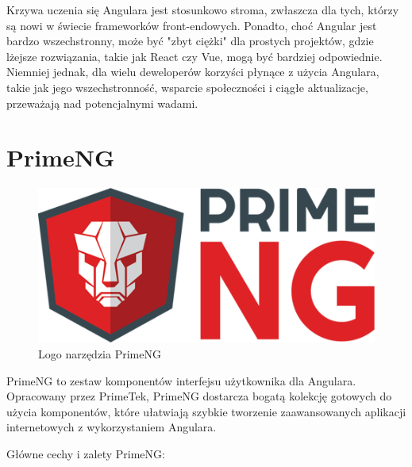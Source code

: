 Krzywa uczenia się Angulara jest stosunkowo stroma, zwłaszcza dla tych, którzy są nowi w świecie frameworków front-endowych. Ponadto, choć Angular jest bardzo wszechstronny, może być "zbyt ciężki" dla prostych projektów, gdzie lżejsze rozwiązania, takie jak React czy Vue, mogą być bardziej odpowiednie. Niemniej jednak, dla wielu deweloperów korzyści płynące z użycia Angulara, takie jak jego wszechstronność, wsparcie społeczności i ciągłe aktualizacje, przeważają nad potencjalnymi wadami.

\section{PrimeNG}
\begin{figure}[h]
    \centering
    \includegraphics[width=0.5\linewidth]{./img/primeng.png}
    \caption{Logo narzędzia PrimeNG}
    \label{fig:PrimeNG}
\end{figure}

PrimeNG to zestaw komponentów interfejsu użytkownika dla Angulara. Opracowany przez PrimeTek, PrimeNG dostarcza bogatą kolekcję gotowych do użycia komponentów, które ułatwiają szybkie tworzenie zaawansowanych aplikacji internetowych z wykorzystaniem Angulara.

Główne cechy i zalety PrimeNG:

